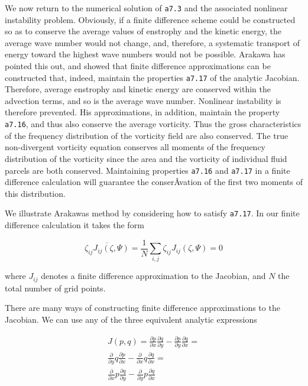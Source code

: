\begin{figure}
\centering
{}
\caption{}
\end{figure}

We now return to the numerical solution of \texttt{a7.3} and the
associated nonlinear instability problem. Obviously, if a finite
difference scheme could be constructed so as to conserve the average
values of enstrophy and the kinetic energy, the average wave number
would not change, and, therefore, a systematic transport of energy
toward the highest wave numbers would not be possible. Arakawa has
pointed this out, and showed that finite difference approximations can
be constructed that, indeed, maintain the properties \texttt{a7.17} of
the analytic Jacobian. Therefore, average enstrophy and kinetic energy
are conserved within the advection terms, and so is the average wave
number. Nonlinear instability is therefore prevented. His
approximations, in addition, maintain the property \texttt{a7.16}, and
thus also conserve the average vorticity. Thus the gross characteristics
of the frequency distribution of the vorticity field are also conserved.
The true non-divergent vorticity equation conserves all moments of the
frequency distribution of the vorticity since the area and the vorticity
of individual fluid parcels are both conserved. Maintaining properties
\texttt{a7.16} and \texttt{a7.17} in a finite difference calculation
will guarantee the conserÂ­vation of the first two moments of this
distribution.

We illustrate Arakawa\textquotesingle s method by considering how to
satisfy \texttt{a7.17}. In our finite difference calculation it takes
the form

{\[\overline{\zeta_{ij}J_{ij}(\zeta,\Psi)} = \frac{1}{N}\sum_{i,j}\zeta_{ij}J_{ij}(\zeta,\Psi) = 0\]}

where \(J_{ij}\) denotes a finite difference approximation to the
Jacobian, and \(N\) the total number of grid points.

There are many ways of constructing finite difference approximations to
the Jacobian. We can use any of the three equivalent analytic
expressions

{\[\begin{aligned}
J(p,q) = \frac{\partial p}{\partial x}\frac{\partial q}{\partial y} -
\frac{\partial p}{\partial y}\frac{\partial q}{\partial x} =\\
\frac{\partial }{\partial y}q\frac{\partial p}{\partial x} -
\frac{\partial }{\partial x}q\frac{\partial q}{\partial x} =\\
\frac{\partial }{\partial x}p\frac{\partial q}{\partial y} -
\frac{\partial }{\partial y}p\frac{\partial q}{\partial x}
\end{aligned}\]}

